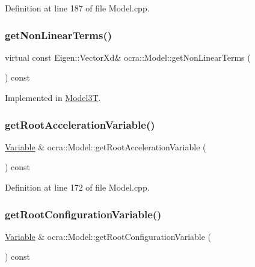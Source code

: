 Definition at line 187 of file Model.\+cpp.

\hypertarget{classocra_1_1Model_ac494939416d3ddcb6e5cf0ece43f3098}{}\label{classocra_1_1Model_ac494939416d3ddcb6e5cf0ece43f3098} 
\subsubsection{\texorpdfstring{get\+Non\+Linear\+Terms()}{getNonLinearTerms()}}
{\footnotesize\ttfamily virtual const Eigen\+::\+Vector\+Xd\& ocra\+::\+Model\+::get\+Non\+Linear\+Terms (\begin{DoxyParamCaption}{ }\end{DoxyParamCaption}) const\hspace{0.3cm}{\ttfamily [pure virtual]}}



Implemented in \hyperlink{classModel3T_af41d3f87cb77877320f4c589d9cf7ffe}{Model3T}.

\hypertarget{classocra_1_1Model_ae342ff99f5249d17014d30863ff7857c}{}\label{classocra_1_1Model_ae342ff99f5249d17014d30863ff7857c} 
\subsubsection{\texorpdfstring{get\+Root\+Acceleration\+Variable()}{getRootAccelerationVariable()}}
{\footnotesize\ttfamily \hyperlink{classocra_1_1Variable}{Variable} \& ocra\+::\+Model\+::get\+Root\+Acceleration\+Variable (\begin{DoxyParamCaption}{ }\end{DoxyParamCaption}) const}



Definition at line 172 of file Model.\+cpp.

\hypertarget{classocra_1_1Model_a68d8c2cf5a411f98e1f624a356b87fba}{}\label{classocra_1_1Model_a68d8c2cf5a411f98e1f624a356b87fba} 
\subsubsection{\texorpdfstring{get\+Root\+Configuration\+Variable()}{getRootConfigurationVariable()}}
{\footnotesize\ttfamily \hyperlink{classocra_1_1Variable}{Variable} \& ocra\+::\+Model\+::get\+Root\+Configuration\+Variable (\begin{DoxyParamCaption}{ }\end{DoxyParamCaption}) const}



